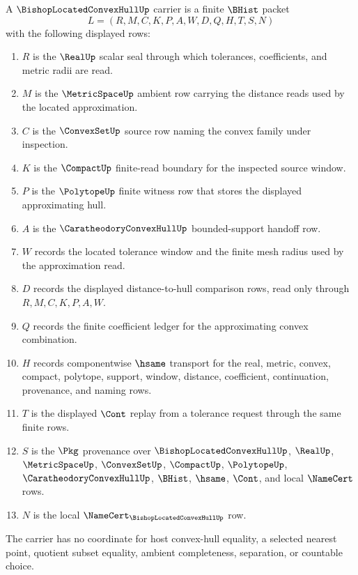 \begin{definition}
\label{def:bishop-located-convex-hull-carrier}
A $\BishopLocatedConvexHullUp$ carrier is a finite $\BHist$ packet
$$
L=(R,M,C,K,P,A,W,D,Q,H,T,S,N)
$$
with the following displayed rows:
\begin{enumerate}
\item $R$ is the $\RealUp$ scalar seal through which tolerances, coefficients, and metric radii are read.
\item $M$ is the $\MetricSpaceUp$ ambient row carrying the distance reads used by the located approximation.
\item $C$ is the $\ConvexSetUp$ source row naming the convex family under inspection.
\item $K$ is the $\CompactUp$ finite-read boundary for the inspected source window.
\item $P$ is the $\PolytopeUp$ finite witness row that stores the displayed approximating hull.
\item $A$ is the $\CaratheodoryConvexHullUp$ bounded-support handoff row.
\item $W$ records the located tolerance window and the finite mesh radius used by the approximation read.
\item $D$ records the displayed distance-to-hull comparison rows, read only through $R,M,C,K,P,A,W$.
\item $Q$ records the finite coefficient ledger for the approximating convex combination.
\item $H$ records componentwise $\hsame$ transport for the real, metric, convex, compact, polytope, support, window, distance, coefficient, continuation, provenance, and naming rows.
\item $T$ is the displayed $\Cont$ replay from a tolerance request through the same finite rows.
\item $S$ is the $\Pkg$ provenance over $\BishopLocatedConvexHullUp$, $\RealUp$, $\MetricSpaceUp$, $\ConvexSetUp$, $\CompactUp$, $\PolytopeUp$, $\CaratheodoryConvexHullUp$, $\BHist$, $\hsame$, $\Cont$, and local $\NameCert$ rows.
\item $N$ is the local $\NameCert_{\BishopLocatedConvexHullUp}$ row.
\end{enumerate}
The carrier has no coordinate for host convex-hull equality, a selected nearest point, quotient subset equality, ambient completeness, separation, or countable choice.
\end{definition}

